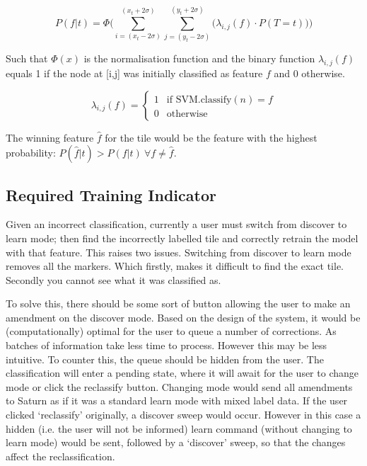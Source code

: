 $$ 
P(f | t)  =
\Phi \Bigg(
\sum_{i=(x_t-2\sigma)}^{(x_t+2\sigma)}
\sum_{j=(y_t-2\sigma)}^{(y_t+2\sigma)}
\Big(
\lambda_{i,j}(f) \cdot P(T = t)
\Big)
\Bigg)
$$

Such that $\Phi(x)$ is the normalisation function and the binary function $\lambda_{i,j}(f)$ equals 1 if the node at [i,j] was initially classified as feature $f$ and 0 otherwise.


$$
\lambda_{i,j}(f) = 
\begin{cases}
\mbox{1} & \text{if SVM.classify}(n) = f\\
\mbox{0} & \text{otherwise}
\end{cases}
$$

The winning feature $\hat{f}$ for the tile would be the feature with the highest probability:
$P(\hat{f}|t) > P(f|t)\ \forall f \neq \hat{f}$. 






\subsection{Required Training Indicator}
Given an incorrect classification, currently a user must switch from discover to learn mode; then find the incorrectly labelled tile and correctly retrain the model with that feature. This raises two issues. Switching from discover to learn mode removes all the markers. Which firstly, makes it difficult to find the exact tile. Secondly you cannot see what it was classified as. 

To solve this, there should be some sort of button allowing the user to make an amendment on the discover mode. Based on the design of the system, it would be (computationally) optimal for the user to queue a number of corrections. As batches of information take less time to process. However this may be less intuitive. To counter this, the queue should be hidden from the user. The classification will enter a pending state, where it will await for the user to change mode or click the reclassify button. Changing mode would send all amendments to Saturn as if it was a standard learn mode with mixed label data. If the user clicked `reclassify' originally, a discover sweep would occur. However in this case a hidden (i.e. the user will not be informed) learn command (without changing to learn mode) would be sent, followed by a `discover' sweep, so that the changes affect the reclassification.  





